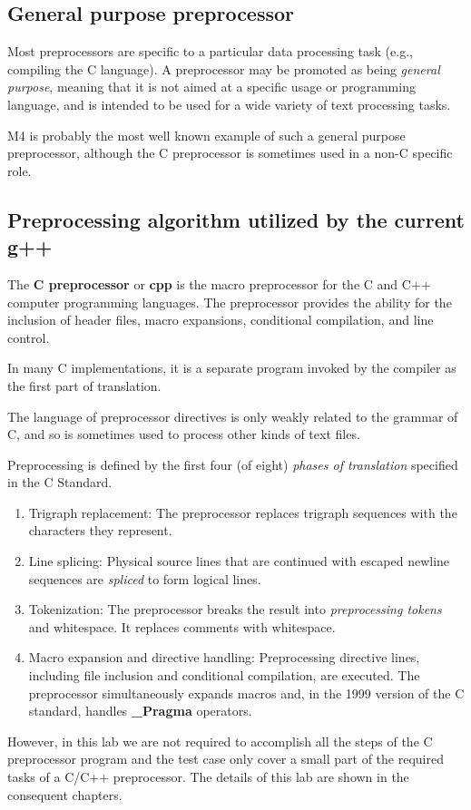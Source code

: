 \documentclass[a4paper]{report}
\begin{document}
\subsection{General purpose preprocessor}
Most preprocessors are specific to a particular data processing task (e.g., compiling the C language). A preprocessor may be promoted as being \emph{general purpose}, meaning that it is not aimed at a specific usage or programming language, and is intended to be used for a wide variety of text processing tasks. 
\par
M4 is probably the most well known example of such a general purpose preprocessor, although the C preprocessor is sometimes used in a non-C specific role.
\subsection{Preprocessing algorithm utilized by the current g++}
The \textbf{C preprocessor} or \textbf{cpp} is the macro preprocessor for the C and C++ computer programming languages. The preprocessor provides the ability for the inclusion of header files, macro expansions, conditional compilation, and line control. 
\par
In many C implementations, it is a separate program invoked by the compiler as the first part of translation. 
\par
The language of preprocessor directives is only weakly related to the grammar of C, and so is sometimes used to process other kinds of text files. 
\par
Preprocessing is defined by the first four (of eight) \emph{phases of translation} specified in the C Standard. 
\begin{enumerate}
\item
Trigraph replacement: The preprocessor replaces trigraph sequences with the characters they represent.
\item
Line splicing: Physical source lines that are continued with escaped newline sequences are \emph{spliced} to form logical lines.
\item
Tokenization: The preprocessor breaks the result into \emph{preprocessing tokens} and whitespace. It replaces comments with whitespace.
\item
Macro expansion and directive handling: Preprocessing directive lines, including file inclusion and conditional compilation, are executed. The preprocessor simultaneously expands macros and, in the 1999 version of the C standard, handles \textbf{\_Pragma} operators.
\end{enumerate}
\par
However, in this lab we are not required to accomplish all the steps of the C preprocessor program and the test case only cover a small part of the required tasks of a C/C++ preprocessor. The details of this lab are shown in the consequent chapters.
\end{document}
